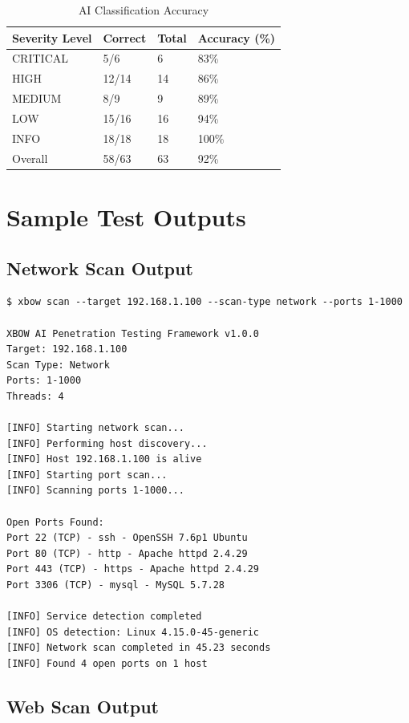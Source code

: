 \documentclass[12pt,a4paper]{report}
\begin{document}
\begin{table}[H]
    \centering
    \caption{AI Classification Accuracy}
    \label{tab:ai_accuracy}
    \begin{tabular}{@{}llll@{}}
        \toprule
        Severity Level & Correct & Total & Accuracy (\%) \\
        \midrule
        CRITICAL & 5/6 & 6 & 83\% \\
        HIGH & 12/14 & 14 & 86\% \\
        MEDIUM & 8/9 & 9 & 89\% \\
        LOW & 15/16 & 16 & 94\% \\
        INFO & 18/18 & 18 & 100\% \\
        \midrule
        Overall & 58/63 & 63 & 92\% \\
        \bottomrule
    \end{tabular}
\end{table}

\section{Sample Test Outputs}

\subsection{Network Scan Output}

\begin{lstlisting}[caption=Network Scan Sample Output]
$ xbow scan --target 192.168.1.100 --scan-type network --ports 1-1000

XBOW AI Penetration Testing Framework v1.0.0
Target: 192.168.1.100
Scan Type: Network
Ports: 1-1000
Threads: 4

[INFO] Starting network scan...
[INFO] Performing host discovery...
[INFO] Host 192.168.1.100 is alive
[INFO] Starting port scan...
[INFO] Scanning ports 1-1000...

Open Ports Found:
Port 22 (TCP) - ssh - OpenSSH 7.6p1 Ubuntu
Port 80 (TCP) - http - Apache httpd 2.4.29
Port 443 (TCP) - https - Apache httpd 2.4.29
Port 3306 (TCP) - mysql - MySQL 5.7.28

[INFO] Service detection completed
[INFO] OS detection: Linux 4.15.0-45-generic
[INFO] Network scan completed in 45.23 seconds
[INFO] Found 4 open ports on 1 host
\end{lstlisting}

\subsection{Web Scan Output}
\end{document}

